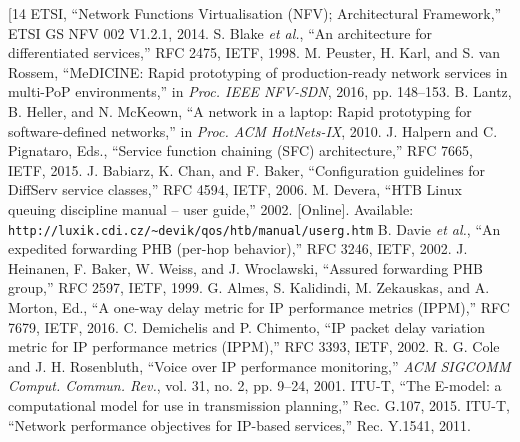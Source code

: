 \documentclass[a4paper]{llncs}
\begin{document}
\begin{thebibliography}{[14}
\makeatletter\renewcommand\@biblabel[1]{[#1]}\makeatother  %
 ETSI, ``Network Functions Virtualisation (NFV); Architectural Framework,'' ETSI GS NFV 002 V1.2.1, 2014.
 S. Blake \emph{et al.}, ``An architecture for differentiated services,'' RFC 2475, IETF, 1998.
 M. Peuster, H. Karl, and S. van Rossem, ``MeDICINE: Rapid prototyping of production-ready network services in multi-PoP environments,'' in \emph{Proc. IEEE NFV-SDN}, 2016, pp. 148--153.
 B. Lantz, B. Heller, and N. McKeown, ``A network in a laptop: Rapid prototyping for software-defined networks,'' in \emph{Proc. ACM HotNets-IX}, 2010.
 J. Halpern and C. Pignataro, Eds., ``Service function chaining (SFC) architecture,'' RFC 7665, IETF, 2015.
 J. Babiarz, K. Chan, and F. Baker, ``Configuration guidelines for DiffServ service classes,'' RFC 4594, IETF, 2006.
 M. Devera, ``HTB Linux queuing discipline manual -- user guide,'' 2002. [Online]. Available: \texttt{http://luxik.cdi.cz/\textasciitilde devik/qos/htb/manual/userg.htm}
 B. Davie \emph{et al.}, ``An expedited forwarding PHB (per-hop behavior),'' RFC 3246, IETF, 2002.
 J. Heinanen, F. Baker, W. Weiss, and J. Wroclawski, ``Assured forwarding PHB group,'' RFC 2597, IETF, 1999.
 G. Almes, S. Kalidindi, M. Zekauskas, and A. Morton, Ed., ``A one-way delay metric for IP performance metrics (IPPM),'' RFC 7679, IETF, 2016.
 C. Demichelis and P. Chimento, ``IP packet delay variation metric for IP performance metrics (IPPM),'' RFC 3393, IETF, 2002.
 R. G. Cole and J. H. Rosenbluth, ``Voice over IP performance monitoring,'' \emph{ACM SIGCOMM Comput. Commun. Rev.}, vol. 31, no. 2, pp. 9--24, 2001.
 ITU-T, ``The E-model: a computational model for use in transmission planning,'' Rec. G.107, 2015.
 ITU-T, ``Network performance objectives for IP-based services,'' Rec. Y.1541, 2011.
\end{thebibliography}
\end{document}
